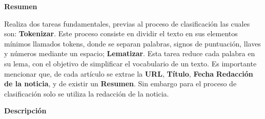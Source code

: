 
\begin{large}
	\textbf{Resumen}\\
\end{large}

Realiza dos tareas fundamentales, previas al proceso de clasificación las cuales son: \textbf{Tokenizar}. Este proceso consiste en dividir el texto en sus elementos mínimos llamados tokens, donde se separan palabras, signos de puntuación, llaves y números mediante un espacio; \textbf{Lematizar}. Esta tarea reduce cada palabra en su lema, con el objetivo de simplificar el vocabulario de un texto. Es importante mencionar que, de cada artículo se extrae la \textbf{URL}, \textbf{Título}, \textbf{Fecha} \textbf{Redacción de la noticia}, y de existir un \textbf{Resumen}. Sin embargo para el proceso de clasificación solo se utiliza la redacción de la noticia.\\ 


\begin{large}
	\textbf{Descripción}\\
\end{large} 



